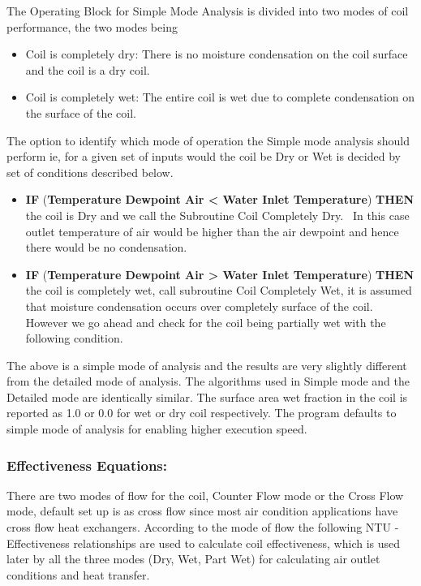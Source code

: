 The Operating Block for Simple Mode Analysis is divided into two modes of coil performance, the two modes being

\begin{itemize}
  \item
    Coil is completely dry: There is no moisture condensation on the coil surface and the coil is a dry coil.
  \item
    Coil is completely wet: The entire coil is wet due to complete condensation on the surface of the coil.
\end{itemize}

The option to identify which mode of operation the Simple mode analysis should perform ie, for a given set of inputs would the coil be Dry or Wet is decided by set of conditions described below.

\begin{itemize}
  \item
    \textbf{IF} (\textbf{Temperature Dewpoint Air \textless{} Water Inlet Temperature}) \textbf{THEN} the coil is Dry and we call the Subroutine Coil Completely Dry.~ In this case outlet temperature of air would be higher than the air dewpoint and hence there would be no condensation.
  \item
    \textbf{IF} (\textbf{Temperature Dewpoint Air \textgreater{} Water Inlet Temperature}) \textbf{THEN} the coil is completely wet, call subroutine Coil Completely Wet, it is assumed that moisture condensation occurs over completely surface of the coil. However we go ahead and check for the coil being partially wet with the following condition.
\end{itemize}

The above is a simple mode of analysis and the results are very slightly different from the detailed mode of analysis. The algorithms used in Simple mode and the Detailed mode are identically similar. The surface area wet fraction in the coil is reported as 1.0 or 0.0 for wet or dry coil respectively. The program defaults to simple mode of analysis for enabling higher execution speed.

\subsubsection{Effectiveness Equations:}\label{effectiveness-equations}

There are two modes of flow for the coil, Counter Flow mode or the Cross Flow mode, default set up is as cross flow since most air condition applications have cross flow heat exchangers. According to the mode of flow the following NTU - Effectiveness relationships are used to calculate coil effectiveness, which is used later by all the three modes (Dry, Wet, Part Wet) for calculating air outlet conditions and heat transfer.

